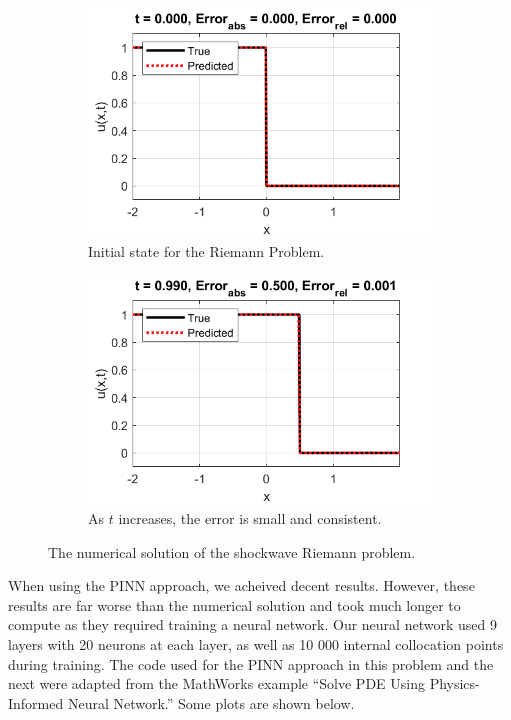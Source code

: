 \documentclass{myproject}
\begin{document}
\begin{figure}
\centering
    \begin{subfigure}{.48\textwidth}
        \centering
        \includegraphics[width=1.0\textwidth]{t0_shockwave.png}
        \caption{Initial state for the Riemann Problem.}
    \end{subfigure}\hfill
    \begin{subfigure}{.48\textwidth}
        \centering
        \includegraphics[width=1\textwidth]{t05_shockwave.png}
        \caption{As $t$ increases, the error is small and consistent.}
    \end{subfigure}
    \caption{The numerical solution of the shockwave Riemann problem.}
\end{figure}

When using the PINN approach, we acheived decent results. However, these results are far worse than the numerical solution and took much longer to compute as they required training a neural network. Our neural network used 9 layers with 20 neurons at each layer, as well as 10 000 internal collocation points during training. The code used for the PINN approach in this problem and the next were adapted from the MathWorks example ``Solve PDE Using Physics-Informed Neural Network.'' Some plots are shown below.
\end{document}

